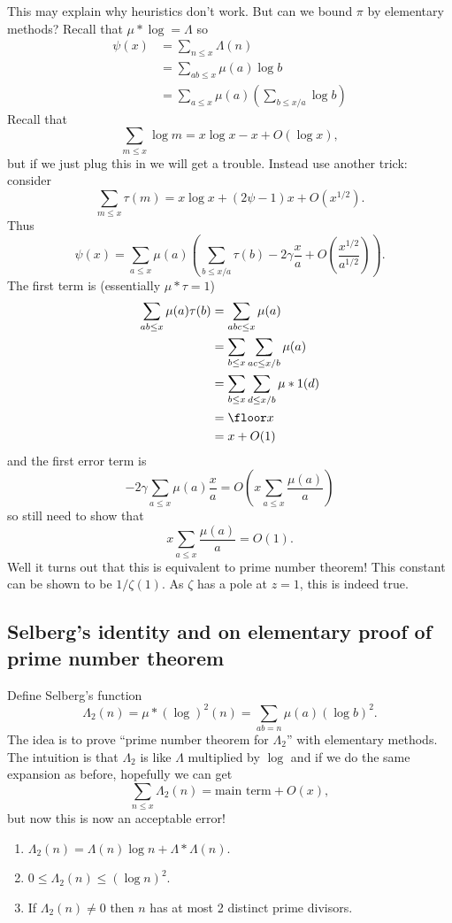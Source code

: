 \documentclass[a4paper]{article}
\theoremstyle{definition}
\begin{document}
This may explain why heuristics don't work. But can we bound \(\pi\) by elementary methods? Recall that \(\mu * \log = \Lambda\) so
\begin{align*}
  \psi(x)
  &= \sum_{n \leq x} \Lambda(n) \\
  &= \sum_{ab \leq x} \mu(a) \log b \\
  &= \sum_{a \leq x} \mu(a) \left( \sum_{b \leq x/a} \log b \right)
\end{align*}
Recall that
\[
  \sum_{m \leq x} \log m = x \log x - x + O(\log x),
\]
but if we just plug this in we will get a trouble. Instead use another trick: consider
\[
  \sum_{m \leq x} \tau(m) = x \log x + (2 \psi - 1) x + O(x^{1/2}).
\]
Thus
\[
  \psi(x)
  = \sum_{a \leq x} \mu(a) \left( \sum_{b \leq x/a} \tau(b) - 2\gamma \frac{x}{a} + O(\frac{x^{1/2}}{a^{1/2}}) \right).
\]
The first term is (essentially \(\mu * \tau = 1\))
\begin{align*}
  \sum_{ab \leq x} \mu(a)\tau(b)
  &= \sum_{abc \leq x} \mu(a) \\
  &= \sum_{b \leq x} \sum_{ac \leq x/b} \mu(a) \\
  &= \sum_{b \leq x} \sum_{d \leq x/b} \mu * 1(d) \\
  &= \floor x \\
  &= x + O(1)
\end{align*}
and the first error term is
\[
  -2\gamma \sum_{a \leq x} \mu(a) \frac{x}{a} = O(x\sum_{a \leq x} \frac{\mu(a)}{a})
\]
so still need to show that
\[
  x \sum_{a \leq x} \frac{\mu(a)}{a} = O(1).
\]
Well it turns out that this is equivalent to prime number theorem! This constant can be shown to be \(1/\zeta(1)\). As \(\zeta\) has a pole at \(z = 1\), this is indeed true.\label{proof:attempted elementary proof of PNT}

\subsection{Selberg's identity and on elementary proof of prime number theorem}

Define Selberg's function
\[
  \Lambda_2(n) = \mu* (\log )^2(n) = \sum_{ab = n} \mu(a) (\log b)^2.
\]
The idea is to prove ``prime number theorem for \(\Lambda_2\)'' with elementary methods. The intuition is that \(\Lambda_2\) is like \(\Lambda\) multiplied by \(\log\) and if we do the same expansion as before, hopefully we can get
\[
  \sum_{n \leq x} \Lambda_2(n) = \text{main term} + O(x),
\]
but now this is now an acceptable error!

\begin{lemma}\leavevmode
  \begin{enumerate}
  \item \(\Lambda_2(n) = \Lambda(n) \log n + \Lambda * \Lambda (n)\).
  \item \(0 \leq \Lambda_2(n) \leq (\log n)^2\).
  \item If \(\Lambda_2(n) \neq 0\) then \(n\) has at most 2 distinct prime divisors.
  \end{enumerate}
\end{lemma}
\end{document}

